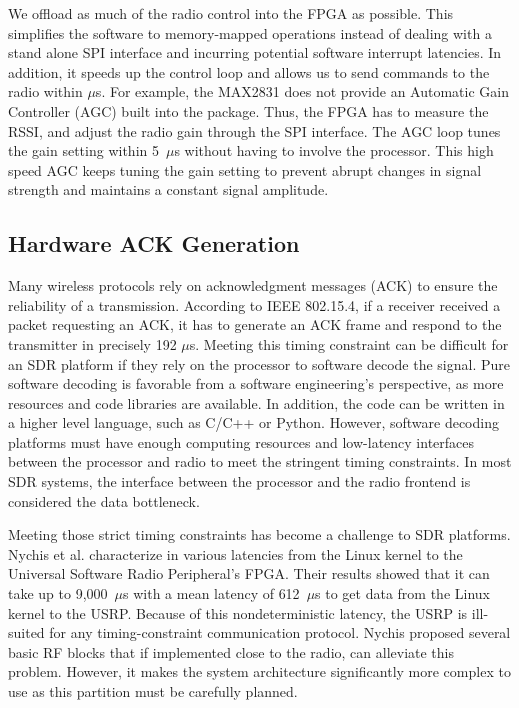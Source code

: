 We offload as much of the radio control into the FPGA as possible. This 
simplifies the software to memory-mapped operations instead of dealing with a
stand alone SPI interface and incurring potential software interrupt
latencies. In addition, it speeds up the control loop and allows us to send
commands to the radio within $\mu$s. For example, the MAX2831 does not provide an
Automatic Gain Controller (AGC) built into the package. Thus, the FPGA has to
measure the RSSI, and adjust the radio gain through the SPI 
interface. The AGC loop tunes the gain setting within 5~$\mu$s without having
to involve the processor. This high speed AGC keeps tuning the gain setting to
prevent abrupt changes in signal strength and maintains a constant signal
amplitude.

\subsection{Hardware ACK Generation}\label{subsec:ack}

Many wireless protocols rely on acknowledgment messages (ACK) to ensure the
reliability of a transmission. According to IEEE 802.15.4, if a receiver
received a packet requesting an ACK, it has to generate an ACK frame and respond
to the transmitter in precisely 192 $\mu$s. Meeting this timing constraint can
be difficult for an SDR platform if they rely on the processor to software
decode the signal. Pure software decoding is favorable from a software
engineering's perspective, as more resources and code libraries are available.
In addition, the code can be written in a higher level language, such as C/C++
or Python. However, software decoding platforms must have enough computing
resources and low-latency interfaces between the processor and radio to meet
the stringent timing constraints. In most SDR systems, the interface between
the processor and the radio frontend is considered the data bottleneck.

Meeting those strict timing constraints has become a challenge to SDR
platforms. Nychis et al. characterize in \cite{2009.Nychis.nsdi} various
latencies from the Linux kernel to the Universal Software Radio Peripheral's
FPGA. Their results showed that it can take up to 9,000~$\mu$s with a mean
latency of 612~$\mu$s to get data from the Linux kernel to the USRP. Because
of this nondeterministic latency, the USRP is ill-suited for any
timing-constraint communication protocol. Nychis proposed several basic RF
blocks that if implemented close to the radio, can alleviate this problem.
However, it makes the system architecture significantly more complex to use as
this partition must be carefully planned.

